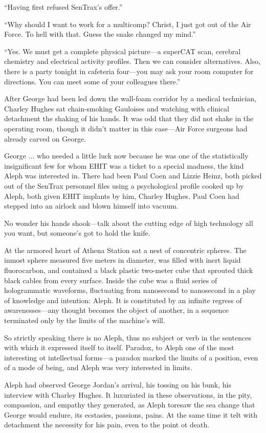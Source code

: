 ``Having first refused SenTrax’s offer.''

``Why should I want to work for a multicomp? Christ, I just got out of the Air Force. To hell with that. Guess the snake changed my mind.''

``Yes. We must get a complete physical picture—a superCAT scan, cerebral chemistry and electrical activity profiles. Then we can consider alternatives. Also, there is a party tonight in cafeteria four---you may ask your room computer for directions. You can meet some of your colleagues there.''

After George had been led down the wall-foam corridor by a medical technician, Charley Hughes sat chain-smoking Gauloises and watching with clinical detachment the shaking of his hands. It was odd that they did not shake in the operating room, though it didn’t matter in this case---Air Force surgeons had already carved on George.

George ... who needed a little luck now because he was one of the statistically insignificant few for whom EHIT was a ticket to a special madness, the kind Aleph was interested in. There had been Paul Coen and Lizzie Heinz, both picked out of the SenTrax personnel files using a psychological profile cooked up by Aleph, both given EHIT implants by him, Charley Hughes. Paul Coen had stepped into an airlock and blown himself into vacuum.

No wonder his hands shook—talk about the cutting edge of high technology all you want, but someone’s got to hold the knife.

At the armored heart of Athena Station sat a nest of concentric spheres. The inmost sphere measured five meters in diameter, was filled with inert liquid fluorocarbon, and contained a black plastic two-meter cube that sprouted thick black cables from every surface. Inside the cube was a fluid series of hologrammatic waveforms, fluctuating from nanosecond to nanosecond in a play of knowledge and intention: Aleph. It is constituted by an infinite regress of awarenesses—any thought becomes the object of another, in a sequence terminated only by the limits of the machine’s will.

So strictly speaking there is no Aleph, thus no subject or verb in the sentences with which it expressed itself to itself. Paradox, to Aleph one of the most interesting ot intellectual forms—a paradox marked the limits of a position, even of a mode of being, and Aleph was very interested in limits.

Aleph had observed George Jordan’s arrival, his tossing on his bunk, his interview with Charley Hughes. It luxuriated in these observations, in the pity, compassion, and empathy they generated, as Aleph toresaw the sea change that George would endure, its ecstasies, passions, pains. At the same time it telt with detachment the necessity for his pain, even to the point ot death.

